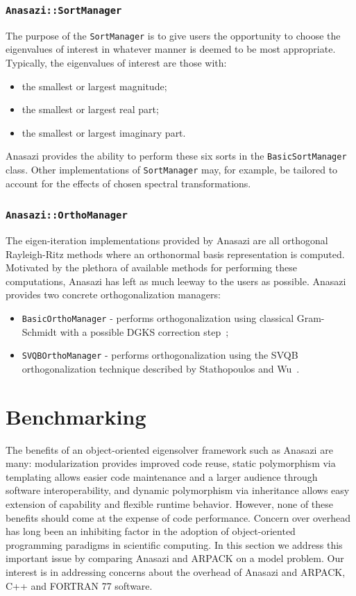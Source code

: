 \documentclass[acmtoms,acmnow]{acmtrans2m}
\newcommand{\aspace}[1]{\texttt{#1}}
\begin{document}
\subsubsection{\aspace{Anasazi::SortManager}}

The purpose of the \aspace{SortManager} is to give users the opportunity to choose the 
eigenvalues of interest in whatever manner is deemed to be most appropriate. 
Typically, the eigenvalues of interest are those with:
\begin{itemize}
  \item the smallest or largest magnitude;
  \item the smallest or largest real part;
  \item the smallest or largest imaginary part.
\end{itemize}
Anasazi provides the ability to perform these six sorts in the \aspace{BasicSortManager}
class. Other implementations of \aspace{SortManager} may, for example, be tailored to
account for the effects of chosen spectral transformations.

\subsubsection{\aspace{Anasazi::OrthoManager}}

The eigen-iteration implementations provided by Anasazi are all orthogonal 
Rayleigh-Ritz methods where an orthonormal basis representation is computed. 
Motivated by the plethora of available methods for performing these 
computations, Anasazi has left as much leeway to the users as possible. 
Anasazi provides two concrete orthogonalization managers:
\begin{itemize}
\item
  \aspace{BasicOrthoManager} - performs orthogonalization using
  classical Gram-Schmidt with a possible DGKS correction step~\cite{dgks:76};
\item
  \aspace{SVQBOrthoManager} - performs orthogonalization using the
  SVQB orthogonalization technique described by Stathopoulos and
  Wu~\cite{Stathopoulos:2002:BOP}.
\end{itemize}

\section{Benchmarking}
\label{sec:benchmarking}

The benefits of an object-oriented eigensolver framework such as Anasazi are many:
modularization provides improved code reuse, static polymorphism via templating allows
easier code maintenance and a larger audience through software interoperability, and
dynamic polymorphism via inheritance allows easy extension of capability and flexible
runtime behavior. However, none of these benefits should come at the expense of code
performance. Concern over overhead has long been an inhibiting factor in the adoption of
object-oriented programming paradigms in scientific computing. In this section we 
address this important issue by comparing Anasazi and ARPACK on a model problem. Our
interest is in addressing concerns about the overhead of Anasazi and ARPACK, C++ and
FORTRAN 77 software.
\end{document}
